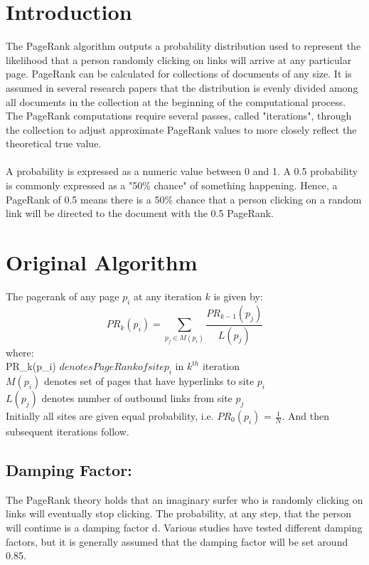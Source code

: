 \documentclass[10pt,a4paper]{article}
\begin{document}
\section{Introduction}
The PageRank algorithm outputs a probability distribution used to represent the likelihood that a person randomly clicking on links will arrive at any particular page. PageRank can be calculated for collections of documents of any size. It is assumed in several research papers that the distribution is evenly divided among all documents in the collection at the beginning of the computational process. The PageRank computations require several passes, called "iterations", through the collection to adjust approximate PageRank values to more closely reflect the theoretical true value.\\ \\
A probability is expressed as a numeric value between 0 and 1. A 0.5 probability is commonly expressed as a "50\% chance" of something happening. Hence, a PageRank of 0.5 means there is a 50\% chance that a person clicking on a random link will be directed to the document with the 0.5 PageRank.
\section{Original Algorithm}
The pagerank of any page $p_i$ at any iteration $k$ is given by:
\begin{equation}
PR_k(p_i) = \sum_{p_j \in M(p_i)} \frac{PR_{k-1}(p_j)}{L(p_j)}
\end{equation}
where:\\ 
    PR_k(p_i) $ denotes PageRank of site p_i$ in $k^{th}$ iteration\\
    $M(p_i)$ denotes set of pages that have hyperlinks to site $p_i$\\
    {$L(p_j)$} denotes number of outbound links from site $p_j$\\
Initially all sites are given equal probability, i.e. $PR_0(p_i)$ = $\frac{1}{N}$. And then subsequent iterations follow.
\subsection*{Damping Factor: }
The PageRank theory holds that an imaginary surfer who is randomly clicking on links will eventually stop clicking. The probability, at any step, that the person will continue is a damping factor d. Various studies have tested different damping factors, but it is generally assumed that the damping factor will be set around 0.85.
\end{document}
